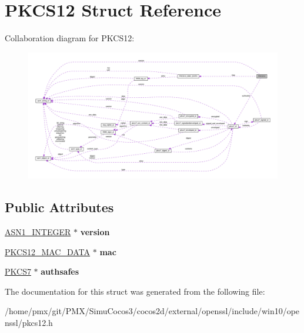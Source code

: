 \hypertarget{structPKCS12}{}\section{P\+K\+C\+S12 Struct Reference}
\label{structPKCS12}


Collaboration diagram for P\+K\+C\+S12\+:
\nopagebreak
\begin{figure}[H]
\begin{center}
\leavevmode
\includegraphics[width=350pt]{structPKCS12__coll__graph}
\end{center}
\end{figure}
\subsection*{Public Attributes}
\begin{DoxyCompactItemize}
\item 
\mbox{\label{structPKCS12_a36ed18715f06725345e12b6f9904e908}} 
\hyperlink{structasn1__string__st}{A\+S\+N1\+\_\+\+I\+N\+T\+E\+G\+ER} $\ast$ {\bfseries version}
\item 
\mbox{\label{structPKCS12_a5184aa35cbf7f56ab133402077c9ea8e}} 
\hyperlink{structPKCS12__MAC__DATA}{P\+K\+C\+S12\+\_\+\+M\+A\+C\+\_\+\+D\+A\+TA} $\ast$ {\bfseries mac}
\item 
\mbox{\label{structPKCS12_ab861e41463d92627b4ff4a42ca1d2cee}} 
\hyperlink{structpkcs7__st}{P\+K\+C\+S7} $\ast$ {\bfseries authsafes}
\end{DoxyCompactItemize}


The documentation for this struct was generated from the following file\+:\begin{DoxyCompactItemize}
\item 
/home/pmx/git/\+P\+M\+X/\+Simu\+Cocos3/cocos2d/external/openssl/include/win10/openssl/pkcs12.\+h\end{DoxyCompactItemize}
